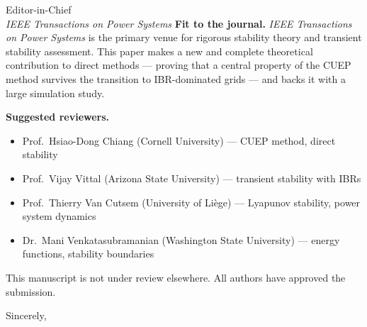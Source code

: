 \documentclass[11pt,a4paper]{letter}
\begin{document}
\begin{letter}{Editor-in-Chief\\
               \textit{IEEE Transactions on Power Systems}}
\textbf{Fit to the journal.}
\textit{IEEE Transactions on Power Systems} is the primary venue for
rigorous stability theory and transient stability assessment.
This paper makes a new and complete theoretical contribution to direct
methods --- proving that a central property of the CUEP method survives
the transition to IBR-dominated grids --- and backs it with a large
simulation study.

\textbf{Suggested reviewers.}
\begin{itemize}
  \item Prof.\ Hsiao-Dong Chiang (Cornell University)
        --- CUEP method, direct stability
  \item Prof.\ Vijay Vittal (Arizona State University)
        --- transient stability with IBRs
  \item Prof.\ Thierry Van Cutsem (University of Li\`{e}ge)
        --- Lyapunov stability, power system dynamics
  \item Dr.\ Mani Venkatasubramanian (Washington State University)
        --- energy functions, stability boundaries
\end{itemize}

This manuscript is not under review elsewhere.
All authors have approved the submission.

\closing{Sincerely,}
\end{letter}
\end{document}
